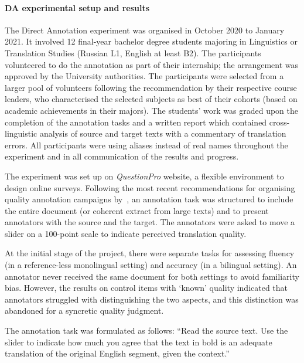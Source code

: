 \paragraph{DA experimental setup and results} 
The Direct Annotation experiment was organised in October 2020 to January 2021. It involved 12 final-year bachelor degree students majoring in Linguistics or Translation Studies (Russian L1, English at least B2). The participants volunteered to do the annotation as part of their internship; the arrangement was approved by the University authorities. The participants were selected from a larger pool of volunteers following the recommendation by their respective course leaders, who characterised the selected subjects as best of their cohorts (based on academic achievements in their majors). 
The students' work was graded upon the completion of the annotation tasks and a written report which contained cross-linguistic analysis of source and target texts with a commentary of translation errors. All participants were using aliases instead of real names throughout the experiment and in all communication of the results and progress. 

The experiment was set up on \textit{QuestionPro} website, a flexible environment to design online surveys. Following the most recent recommendations for organising quality annotation campaigns by~\citet{Laubli2020}, an annotation task was structured to include the entire document (or coherent extract from large texts) and to present annotators with the source and the target. The annotators were asked to move a slider on a 100-point scale to indicate perceived translation quality.

At the initial stage of the project, there were separate tasks for assessing fluency (in a reference-less monolingual setting) and accuracy (in a bilingual setting). An annotator never received the same document for both settings to avoid familiarity bias. However, the results on control items with `known' quality indicated that annotators struggled with distinguishing the two aspects, and this distinction was abandoned for a syncretic quality judgment. 

The annotation task was formulated as follows: ``Read the source text. Use the slider to indicate how much you agree that the text in bold is an adequate translation of the original English segment, given the context.'' 

